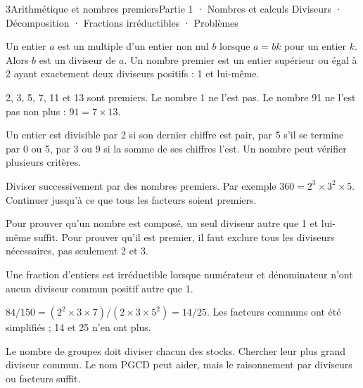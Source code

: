 \begin{ouverture}[courbe]{3}{Arithmétique et nombres premiers}{Partie 1 · Nombres et calculs}
{Diviseurs · Décomposition · Fractions irréductibles · Problèmes}
\end{ouverture}
\pagestyle{otMain}\essentiel\fontsize{11}{15}\selectfont
{}
\begin{definition}Un entier $a$ est un multiple d’un entier non nul $b$ lorsque $a=bk$ pour un entier $k$. Alors $b$ est un diviseur de $a$. Un nombre premier est un entier supérieur ou égal à 2 ayant exactement deux diviseurs positifs : 1 et lui-même.\end{definition}
\begin{exemple}2, 3, 5, 7, 11 et 13 sont premiers. Le nombre 1 ne l’est pas. Le nombre 91 ne l’est pas non plus : $91=7\times13$.\end{exemple}
\begin{propriete}Un entier est divisible par 2 si son dernier chiffre est pair, par 5 s’il se termine par 0 ou 5, par 3 ou 9 si la somme de ses chiffres l’est. Un nombre peut vérifier plusieurs critères.\end{propriete}
\begin{savoirfaire}[Décomposer]Diviser successivement par des nombres premiers. Par exemple $360=2^3\times3^2\times5$. Continuer jusqu’à ce que tous les facteurs soient premiers.\end{savoirfaire}
\begin{attention}Pour prouver qu’un nombre est composé, un seul diviseur autre que 1 et lui-même suffit. Pour prouver qu’il est premier, il faut exclure tous les diviseurs nécessaires, pas seulement 2 et 3.\end{attention}
\clearpage
{}
\begin{definition}Une fraction d’entiers est irréductible lorsque numérateur et dénominateur n’ont aucun diviseur commun positif autre que 1.\end{definition}
\begin{exemple}$84/150=(2^2\times3\times7)/(2\times3\times5^2)=14/25$. Les facteurs communs ont été simplifiés ; 14 et 25 n’en ont plus.\end{exemple}
\begin{savoirfaire}Le nombre de groupes doit diviser chacun des stocks. Chercher leur plus grand diviseur commun. Le nom PGCD peut aider, mais le raisonnement par diviseurs ou facteurs suffit.\end{savoirfaire}
